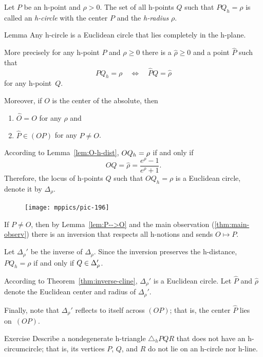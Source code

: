 Let $P$ be an h-point and $\rho>0$.
The set of all h-points $Q$ such that $PQ_h=\rho$ is called an \emph{h-circle} with the center $P$ and the \emph{h-radius} $\rho$.

\begin{thm}{Lemma}\label{lem:h-circle=circle}
Any h-circle is a Euclidean circle that lies completely in the h-plane.

More precisely for any h-point $P$ and $\rho\ge 0$
there is a $\hat\rho\ge 0$ and a point $\hat P$ such that 
$$PQ_h= \rho
\quad 
\iff
\quad
\hat PQ= \hat\rho$$
for any h-point~$Q$.

Moreover, if $O$ is the center of the absolute, then 
\begin{enumerate}
\item $\hat O=O$ for any $\rho$ and
\item $\hat P\in (OP)$ for any $P\ne O$.
\end{enumerate}

\end{thm}

According to Lemma~\ref{lem:O-h-dist}, 
$OQ_h\z= \rho$ if and only if $$OQ= \hat\rho=\frac{e^\rho-1}{e^\rho+1}.$$
Therefore, the locus of h-points $Q$ such that $OQ_h= \rho$ is a Euclidean circle, 
denote it by $\Delta_\rho$.

\begin{figure}
\vskip-3mm
\centering
\texttt{[image: mppics/pic-196]}
\end{figure}

If $P\ne O$, then by Lemma~\ref{lem:P-->O} and the main observation (\ref{thm:main-observ})
there is an inversion that respects all h-notions and sends $O\mapsto P$.

Let $\Delta_\rho'$ be the inverse of $\Delta_\rho$.
Since the inversion preserves the h-distance,
$PQ_h=\rho$ if and only if $Q\z\in\Delta_\rho'$.

According to Theorem~\ref{thm:inverse-cline}, $\Delta_\rho'$ is a Euclidean circle.
Let $\hat P$ and $\hat\rho$ denote the Euclidean center and radius of $\Delta_\rho'$.

Finally, note that $\Delta_\rho'$ reflects to itself across $(OP)$;
that is, the center $\hat P$ lies on~$(OP)$.
\qeds

\begin{thm}{Exercise}\label{ex:h-circle=circle}
Describe a nondegenerate h-triangle $\triangle_hPQR$ that does not have an h-circumcircle;
that is, its vertices $P$, $Q$, and $R$ do not lie on an h-circle nor h-line.
\end{thm}

